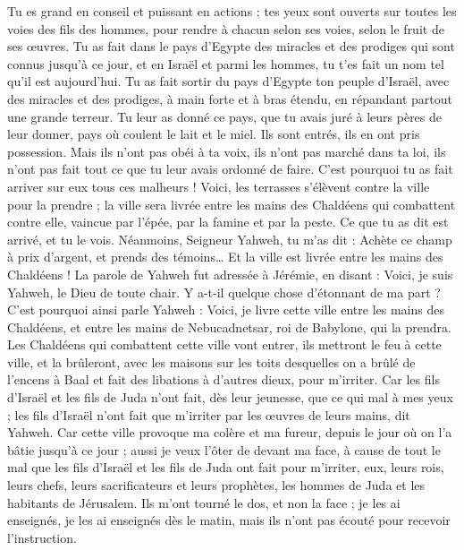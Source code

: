 \begin{multicols}{2}
Tu es grand en conseil et puissant en actions ; tes yeux sont ouverts sur toutes les voies des fils des hommes, pour rendre à chacun selon ses voies, selon le fruit de ses œuvres.
Tu as fait dans le pays d'Egypte des miracles et des prodiges qui sont connus jusqu’à ce jour, et en Israël et parmi les hommes, tu t'es fait un nom tel qu'il est aujourd'hui.
Tu as fait sortir du pays d'Egypte ton peuple d’Israël, avec des miracles et des prodiges, à main forte et à bras étendu, en répandant partout une grande terreur.
Tu leur as donné ce pays, que tu avais juré à leurs pères de leur donner, pays où coulent le lait et le miel.
Ils sont entrés, ils en ont pris possession. Mais ils n'ont pas obéi à ta voix, ils n'ont pas marché dans ta loi, ils n'ont pas fait tout ce que tu leur avais ordonné de faire. C'est pourquoi tu as fait arriver sur eux tous ces malheurs !
Voici, les terrasses s’élèvent contre la ville pour la prendre ; la ville sera livrée entre les mains des Chaldéens qui combattent contre elle, vaincue par l'épée, par la famine et par la peste. Ce que tu as dit est arrivé, et tu le vois.
Néanmoins, Seigneur Yahweh, tu m'as dit : Achète ce champ à prix d'argent, et prends des témoins… Et la ville est livrée entre les mains des Chaldéens !
La parole de Yahweh fut adressée à Jérémie, en disant :
Voici, je suis Yahweh, le Dieu de toute chair. Y a-t-il quelque chose d’étonnant de ma part ?
C'est pourquoi ainsi parle Yahweh : Voici, je livre cette ville entre les mains des Chaldéens, et entre les mains de Nebucadnetsar, roi de Babylone, qui la prendra.
Les Chaldéens qui combattent cette ville vont entrer, ils mettront le feu à cette ville, et la brûleront, avec les maisons sur les toits desquelles on a brûlé de l’encens à Baal et fait des libations à d'autres dieux, pour m’irriter.
Car les fils d'Israël et les fils de Juda n'ont fait, dès leur jeunesse, que ce qui mal à mes yeux ; les fils d'Israël n’ont fait que m’irriter par les œuvres de leurs mains, dit Yahweh.
Car cette ville provoque ma colère et ma fureur, depuis le jour où on l'a bâtie jusqu’à ce jour ; aussi je veux l'ôter de devant ma face,
à cause de tout le mal que les fils d'Israël et les fils de Juda ont fait pour m’irriter, eux, leurs rois, leurs chefs, leurs sacrificateurs et leurs prophètes, les hommes de Juda et les habitants de Jérusalem.
Ils m'ont tourné le dos, et non la face ; je les ai enseignés, je les ai enseignés dès le matin, mais ils n'ont pas écouté pour recevoir l’instruction.

\end{multicols}
